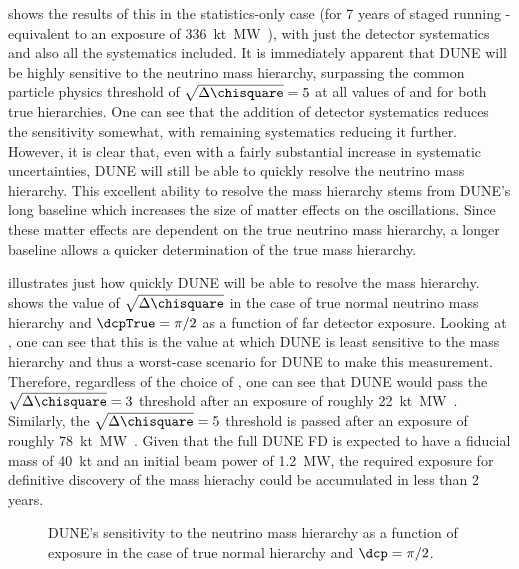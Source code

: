  shows the results of this in the statistics-only case (for 7 years of staged running - equivalent to an exposure of \SI{336}{\kilo\tonne\mega\watt\year}), with just the detector systematics and also all the systematics included.
It is immediately apparent that DUNE will be highly sensitive to the neutrino mass hierarchy, surpassing the common particle physics threshold of $\sqrt{\Delta \chisquare} = 5$ at all values of \dcp and for both true hierarchies.
One can see that the addition of detector systematics reduces the sensitivity somewhat, with remaining systematics reducing it further.
However, it is clear that, even with a fairly substantial increase in systematic uncertainties, DUNE will still be able to quickly resolve the neutrino mass hierarchy.
This excellent ability to resolve the mass hierarchy stems from DUNE's long baseline which increases the size of matter effects on the oscillations. 
Since these matter effects are dependent on the true neutrino mass hierarchy, a longer baseline allows a quicker determination of the true mass hierarchy.

 illustrates just how quickly DUNE will be able to resolve the mass hierarchy.
 shows the value of $\sqrt{\Delta\chisquare}$ in the case of true normal neutrino mass hierarchy and $\dcpTrue = \pi/2$ as a function of far detector exposure. 
Looking at , one can see that this is the value at which DUNE is least sensitive to the mass hierarchy and thus a worst-case scenario for DUNE to make this measurement.
Therefore, regardless of the choice of \dcp, one can see that DUNE would pass the $\sqrt{\Delta\chisquare}=3$ threshold after an exposure of roughly \SI{22}{\kilo\tonne\mega\watt\year}.
Similarly, the $\sqrt{\Delta\chisquare}=5$ threshold is passed after an exposure of roughly \SI{78}{\kilo\tonne\mega\watt\year}.
Given that the full DUNE FD is expected to have a fiducial mass of \SI{40}{\kilo\tonne} and an initial beam power of \SI{1.2}{\mega\watt}, the required exposure for definitive discovery of the mass hierachy could be accumulated in less than 2 years.

\begin{figure}[h]
	\begin{adjustbox}{max totalsize=.6\linewidth, center}
		
	\end{adjustbox}
	\caption[DUNE's sensitivity to the neutrino mass hierarchy as a function of exposure]{DUNE's sensitivity to the neutrino mass hierarchy as a function of exposure in the case of true normal hierarchy and $\dcp=\pi/2$.}
	\label{fig:mhSensExp}
\end{figure}

